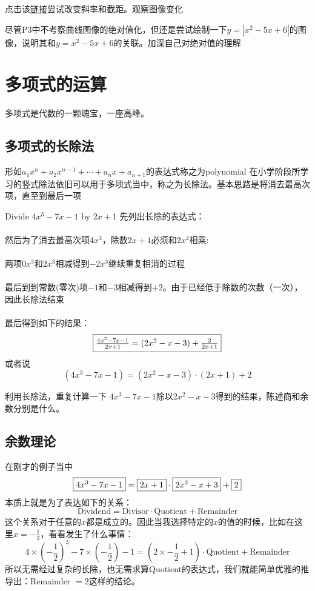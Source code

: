 点击该\href{https://www.desmos.com/calculator/qkkzxj8wwr}{链接}尝试改变斜率和截距。观察图像变化

\begin{TaskBox}
尽管P3中不考察曲线图像的绝对值化，但还是尝试绘制一下$y=|x^2-5x+6|$的图像，说明其和$y=x^2-5x+6$的关联。加深自己对绝对值的理解
\end{TaskBox}
\clearpage

\section{多项式的运算}
多项式是代数的一颗瑰宝，一座高峰。

\subsection*{多项式的长除法}
形如$a_1x^n+a_2x^{n-1}+\cdots+a_nx+a_{n+1}$的表达式称之为\gls{polynomial}
在小学阶段所学习的竖式除法依旧可以用于多项式当中，称之为长除法。基本思路是将消去最高次项，直至到最后一项

\begin{ExampleBox}
Divide $4x^3-7x-1$ by $2x+1$
\tcblower
先列出长除的表达式：\\
\\
然后为了消去最高次项$4x^3$，除数$2x+1$必须和$2x^2$相乘:\\
\\
两项$0x^3$和$2x^3$相减得到$-2x^3$继续重复相消的过程\\
\\
最后到到常数(零次)项$-1$和$-3$相减得到$+2$。由于已经低于除数的次数（一次），因此长除法结束\\
\\

最后得到如下的结果：
\[
\fbox{$\frac{4x^3-7x-1}{2x+1}=(2x^2-x-3)+\frac{2}{2x+1}$}
\]
或者说
\[
	(4x^3-7x-1)= (2x^2-x-3)\cdot (2x+1) +2
\]
\end{ExampleBox}

\begin{TaskBox}
 利用长除法，重复计算一下 $4x^3-7x-1$除以$2x^2-x-3$得到的结果，陈述商和余数分别是什么。
\end{TaskBox}

\subsection*{余数理论}
在刚才的例子当中
\[
	\fbox{$4x^3-7x-1$}=\fbox{$2x+1$}\cdot\fbox{$2x^2-x+3$}+\fbox{$2$}
\]
本质上就是为了表达如下的关系：
\[
	\text{Dividend} = \text{Divisor} \cdot \text{Quotient}+\text{Remainder}
\]
这个关系对于任意的$x$都是成立的。因此当我选择特定的$x$的值的时候，比如在这里$x=-\frac{1}{2}$，看看发生了什么事情：
\[
	4\times \left(-\frac{1}{2}\right)^3-7\times\left(-\frac{1}{2} \right)-1 = \left(2\times -\frac{1}{2}+1\right)\cdot \text{Quotient} + \text{Remainder}
\]
所以无需经过复杂的长除，也无需求算Quotient的表达式，我们就能简单优雅的推导出：Remainder $= 2$这样的结论。

